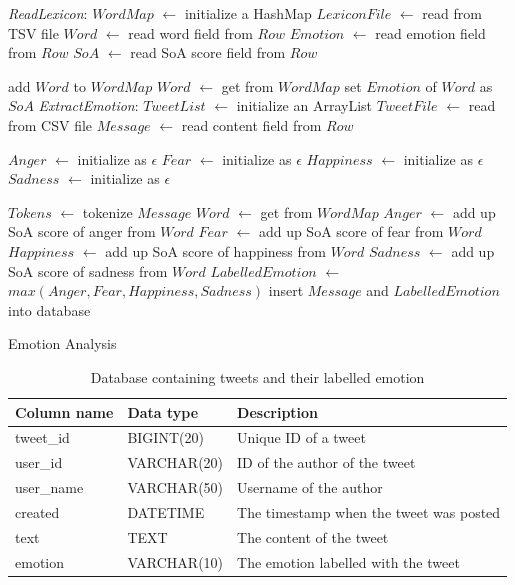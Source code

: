 \begin{algorithm}
\begin{algorithmic}[1]
\BState \emph{ReadLexicon}:
	\State $WordMap$ $\gets$ initialize a HashMap
	\State $LexiconFile$ $\gets$ read from TSV file
		\State $Word$ $\gets$ read word field from $Row$
		\State $Emotion$ $\gets$ read emotion field from $Row$
		\State $SoA$ $\gets$ read SoA score field from $Row$

			\State add $Word$ to $WordMap$
		\Else
			\State $Word$ $\gets$ get from $WordMap$
		\EndIf
		\State set $Emotion$ of $Word$ as $SoA$
	\EndFor
\BState \emph{ExtractEmotion}:
	\State $TweetList$ $\gets$ initialize an ArrayList
	\State $TweetFile$ $\gets$ read from CSV file
		\State $Message$ $\gets$ read content field from $Row$

		\State $Anger$ $\gets$ initialize as $\epsilon$
		\State $Fear$ $\gets$ initialize as $\epsilon$
		\State $Happiness$ $\gets$ initialize as $\epsilon$
		\State $Sadness$ $\gets$ initialize as $\epsilon$

		\State $Tokens$ $\gets$ tokenize $Message$
				\State $Word$ $\gets$ get from $WordMap$
				\State $Anger$ $\gets$ add up SoA score of anger from $Word$
				\State $Fear$ $\gets$ add up SoA score of fear from $Word$
				\State $Happiness$ $\gets$ add up SoA score of happiness from $Word$
				\State $Sadness$ $\gets$ add up SoA score of sadness from $Word$
			\EndIf
		\EndFor
		\State $LabelledEmotion$ $\gets$ $max(Anger, Fear, Happiness, Sadness)$
		\State insert $Message$ and $LabelledEmotion$ into database
	\EndFor
\end{algorithmic}
\caption{Emotion Analysis}
\label{algorith:pseudocode}
\end{algorithm}

\begin{table}[hb!]
\centering
\caption{Database containing tweets and their labelled emotion}
\label{table:databaseTweet}
\begin{tabular}{|l|l|l|}

\hline
\textbf{Column name} & \textbf{Data type} & \textbf{Description} \\ \hline \hline
tweet\_id & BIGINT(20) & Unique ID of a tweet \\ \hline
user\_id & VARCHAR(20) & ID of the author of the tweet \\ \hline
user\_name & VARCHAR(50) & Username of the author \\ \hline
created & DATETIME & The timestamp when the tweet was posted \\ \hline
text & TEXT & The content of the tweet \\ \hline
emotion & VARCHAR(10) & The emotion labelled with the tweet \\ \hline
\end{tabular}
\end{table}

